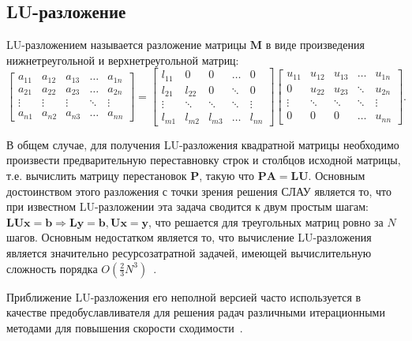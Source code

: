 \subsection{LU-разложение}
LU-разложением называется разложение матрицы $\mathbf{M}$ в виде произведения нижнетреугольной и верхнетреугольной матриц:
\[
	\begin{bmatrix}
	    a_{11} & a_{12} & a_{13} & \dots  & a_{1n} \\
	    a_{21} & a_{22} & a_{23} & \dots  & a_{2n} \\
	    \vdots & \vdots & \vdots & \ddots & \vdots \\
	    a_{n1} & a_{n2} & a_{n3} & \dots  & a_{nn}
	\end{bmatrix}
	=
	\begin{bmatrix}
	    l_{11} & 0      & 0      & \dots  & 0      \\
	    l_{21} & l_{22} & 0      & \ddots & 0      \\
	    \vdots & \ddots & \ddots & \ddots & \vdots \\
	    l_{m1} & l_{m2} & l_{m3} & \dots  & l_{nn}
	\end{bmatrix}
	\begin{bmatrix}
	    u_{11} & u_{12} & u_{13} & \dots  & u_{1n} \\
	    0      & u_{22} & u_{23} & \ddots & u_{2n} \\
	    \vdots & \ddots & \ddots & \ddots & \vdots \\
	    0      & 0      & 0      & \dots  & u_{nn}
	\end{bmatrix}.
\]


В общем случае, для получения LU-разложения квадратной матрицы необходимо произвести предварительную переставновку строк и столбцов исходной матрицы, т.е. вычислить матрицу перестановок $\mathbf{P}$, такую что $\mathbf{P}\mathbf{A} = \mathbf{L}\mathbf{U}$. Основным достоинством этого разложения с точки зрения решения СЛАУ является то, что при известном LU-разложении эта задача сводится к двум простым шагам: $\mathbf{L}\mathbf{U}\mathbf{x} = \mathbf{b} \Longrightarrow \mathbf{L}\mathbf{y} = \mathbf{b}, \mathbf{U}\mathbf{x} = \mathbf{y}$, что решается для треугольных матриц ровно за $N$ шагов. Основным недостатком является то, что вычисление LU-разложения является значительно ресурсозатратной задачей, имеющей вычислительную сложность порядка $O(\frac{2}{3}N^3)$~\cite{wikiLU}.


Приближение LU-разложения его неполной версией часто используется в качестве предобуславливателя для решения радач различными итерационными методами для повышения скорости сходимости~\cite{solverOverview}.


